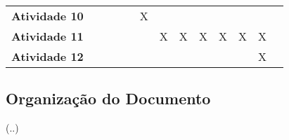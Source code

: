\begin{table}
\begin{center}
\begin{small}
\begin{tabular}{p{5cm}cccccccccccc}
  \textbf{Atividade 10}          &             &             &             &             &      X      &             &             &             &             &             &             \\
  \textbf{Atividade 11}    &             &             &             &             &             &      X      &      X      &      X      &      X      &      X      &      X      \\
  \textbf{Atividade 12}     &             &             &             &             &             &             &             &             &             &             &      X      \\
  \bottomrule
\end{tabular}
\end{small}
\end{center}
\end{table}


\subsection{Organização do Documento}

(..)
